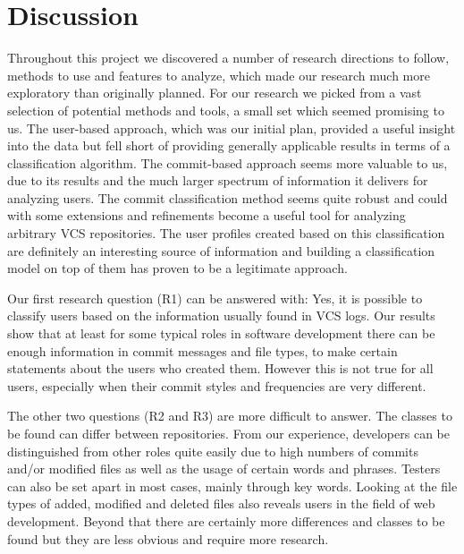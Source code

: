\section{Discussion}

Throughout this project we discovered a number of research directions to follow, methods to use and features to analyze, which made our research much more exploratory than originally planned. For our research we picked from a vast selection of potential methods and tools, a small set which seemed promising to us. %
The user-based approach, which was our initial plan, provided a useful insight into the data but fell short of providing generally applicable results in terms of a classification algorithm. The commit-based approach seems more valuable to us, due to its results and the much larger spectrum of information it delivers for analyzing users. The commit classification method seems quite robust and could with some extensions and refinements become a useful tool for analyzing arbitrary VCS repositories. The user profiles created based on this classification are definitely an interesting source of information and building a classification model on top of them has proven to be a legitimate approach. 

Our first research question (R1) can be answered with: Yes, it is possible to classify users based on the information usually found in VCS logs. Our results show that at least for some typical roles in software development there can be enough information in commit messages and file types, to make certain statements about the users who created them. However this is not true for all users, especially when their commit styles and frequencies are very different.

The other two questions (R2 and R3) are more difficult to answer. The classes to be found can differ between repositories. From our experience, developers can be distinguished from other roles quite easily due to high numbers of commits and/or modified files as well as the usage of certain words and phrases. Testers can also be set apart in most cases, mainly through key words. Looking at the file types of added, modified and deleted files also reveals users in the field of web development. Beyond that there are certainly more differences and classes to be found but they are less obvious and require more research.

